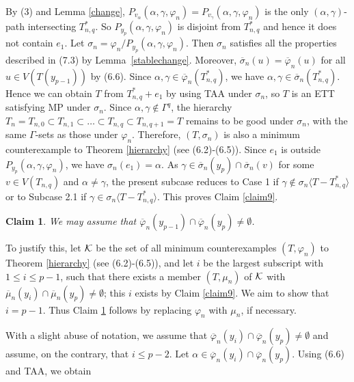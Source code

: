 \documentclass[11pt]{article}
\newtheorem{claim}{Claim}[section]
\newcommand{\phibar}{\overline{\varphi}}
\begin{document}
By (3) and Lemma \ref{change}, $P_{v_{\alpha}}(\alpha,\gamma,\varphi_n)=P_{v_{\gamma}}(\alpha,\gamma,
\varphi_n)$ is the only  $(\alpha,\gamma)$-path intersecting $T_{n,q}^*$. So $P_{y_{p}}(\alpha, \gamma,\varphi_n)$ is 
disjoint from $T_{n,q}^*$ and hence it does not contain $e_1$. Let $\sigma_n = \varphi_n/P_{y_{p}}(\alpha, \gamma,\varphi_n)$. 
Then $\sigma_n$ satisfies all the properties described in (7.3) by Lemma~\ref{stablechange}. Moreover, $\overline{\sigma}_n(u)=\phibar_n(u)$ 
for all $u\in V(T(y_{p-1}))$ by (6.6). Since $\alpha, \gamma\in \phibar_n(T_{n,q}^*)$, we have $\alpha, \gamma\in \overline{\sigma}_n(T_{n,q}^*)$. 
Hence we can obtain $T$ from $T_{n,q}^*+e_1$ by using TAA under $\sigma_n$, so $T$ is an ETT satisfying MP under $\sigma_n$. Since 
$\alpha, \gamma \notin\Gamma^{q}$, the hierarchy $T_n=T_{n,0} \subset T_{n,1} \subset \ldots \subset T_{n,q} 
\subset T_{n,q+1}=T$ remains to be good under $\sigma_n$,  with the same $\Gamma$-sets
as those under $\varphi_n$. Therefore, $(T, \sigma_n)$ is also a minimum counterexample to Theorem \ref{hierarchy} 
(see (6.2)-(6.5)). Since $e_1$ is outside $P_{y_p}(\alpha,\gamma,\varphi_n)$, we have $\sigma_n(e_1)=\alpha$. As 
$\gamma\in\overline{\sigma}_n(y_p)\cap \overline{\sigma}_n(v)$ for some $v\in V(T_{n,q})$ and $\alpha\neq\gamma$, 
the present subcase reduces to Case 1 if $\gamma\notin \sigma_n \langle T-T_{n,q}^* \rangle$ or to Subcase 2.1 if 
$\gamma\in \sigma_n \langle T-T_{n,q}^* \rangle$. This proves Claim \ref{claim9}.

\vskip 3mm

\begin{claim}\label{p-1}
We may assume that $\overline{\varphi}_n(y_{p-1})\cap\overline{\varphi}_n(y_p) \ne \emptyset$.
\end{claim}

\vspace{-1mm}
To justify this, let ${\cal K}$ be the set of all minimum counterexamples $(T, \varphi_n)$ to Theorem \ref{hierarchy} 
(see (6.2)-(6.5)), and let $i$ be the largest subscript with $1 \le i \le p-1$, such that there exists a 
member $(T, \mu_n)$ of ${\cal K}$ with $\overline{\mu}_n(y_{i})\cap\overline{\mu}_n(y_p) \ne \emptyset$;
this $i$ exists by Claim \ref{claim9}. We aim to show that $i=p-1$. Thus Claim \ref{p-1} follows by replacing 
$\varphi_n$ with $\mu_n$, if necessary.

With a slight abuse of notation, we assume that $\overline{\varphi}_n(y_{i})\cap\overline{\varphi}_n(y_p) \ne 
\emptyset$ and assume, on the contrary, that $i\le p-2$. Let $\alpha \in \overline{\varphi}_n(y_{i})\cap\overline{\varphi}_n(y_p)$.
Using (6.6) and TAA, we obtain 
\end{document}
